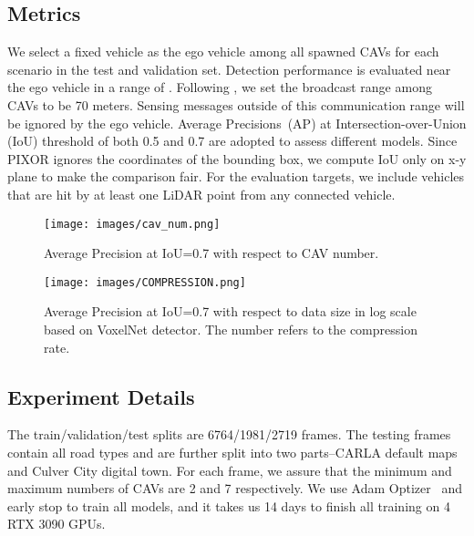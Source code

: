 \documentclass[letterpaper, 10 pt, conference]{ieeeconf}
\begin{document}
\subsection{Metrics}
We select a fixed vehicle as the ego vehicle among all spawned CAVs for each scenario in the test and validation set. Detection performance is evaluated near the ego vehicle in a range of . Following \cite{Wang2020V2VNetVC}, we set the broadcast range among CAVs to be 70 meters. Sensing messages outside of this communication range will be ignored by the ego vehicle. Average Precisions~(AP) at Intersection-over-Union (IoU) threshold of both 0.5 and 0.7 are adopted to assess different models. Since PIXOR ignores the  coordinates of the bounding box, we compute IoU only on x-y plane to make the comparison fair. For the evaluation targets, we include vehicles that are hit by at least one LiDAR point from any connected vehicle. 



\begin{figure}[!t]
\centering
\texttt{[image: images/cav\_num.png]}
\caption{Average Precision at IoU=0.7 with respect to CAV number.}
\label{fig:cav_num}
\end{figure}

\begin{figure}[!t]
\centering
\texttt{[image: images/COMPRESSION.png]}
\caption{Average Precision at IoU=0.7 with respect to data size in log scale based on VoxelNet detector. The number refers to the compression rate.}
\label{fig:compression}
\end{figure}
\subsection{Experiment Details}
The train/validation/test splits are 6764/1981/2719 frames. The testing frames contain all road types and are further split into two parts--CARLA default maps and Culver City digital town. For each frame, we assure that the minimum and maximum numbers of CAVs are 2 and 7 respectively. We use Adam Optizer~\cite{kingma2014adam} and early stop to train all models, and it takes us 14 days to finish all training on  4 RTX 3090 GPUs.
\end{document}
